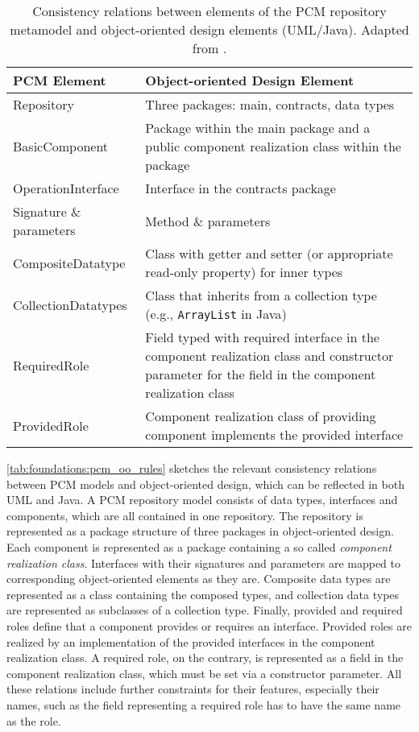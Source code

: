 \begin{table}
	\centering 
    \small
    \renewcommand{\arraystretch}{1.4}
	\begin{tabular}{p{3.2cm} p{6.6cm}}
		\toprule
        \textbf{\gls{PCM} Element}  & \textbf{Object-oriented Design Element} \\
        \midrule
		Repository              & Three packages: main, contracts, data types\\
		BasicComponent 		    & Package within the main package and a public component realization class within the package \\
		OperationInterface		& Interface in the contracts package \\
		Signature \& parameters & Method \& parameters \\
		CompositeDatatype       & Class with getter and setter (or appropriate read-only property) for inner types\\
		CollectionDatatypes     & Class that inherits from a collection type (e.g., \texttt{ArrayList} in Java) \\
		RequiredRole		    & Field typed with required interface in the component realization class and constructor parameter for the field in the component realization class\\
		ProvidedRole		    & Component realization class of providing component implements the provided interface\\
		\bottomrule
	\end{tabular}
	\caption[Consistency relations between PCM and UML/Java]{Consistency relations between elements of the \gls{PCM} repository metamodel and object-oriented design elements (\gls{UML}/Java). Adapted from \cite[Table 4.1]{langhammer2017a}.}
	\label{tab:foundations:pcm_oo_rules}
\end{table}

\autoref{tab:foundations:pcm_oo_rules} sketches the relevant consistency relations between \gls{PCM} models and object-oriented design, which can be reflected in both \gls{UML} and Java.
A \gls{PCM} repository model consists of data types, interfaces and components, which are all contained in one repository.
The repository is represented as a package structure of three packages in object-oriented design.
Each component is represented as a package containing a so called \emph{component realization class}.
Interfaces with their signatures and parameters are mapped to corresponding object-oriented elements as they are.
Composite data types are represented as a class containing the composed types, and collection data types are represented as subclasses of a collection type.
Finally, provided and required roles define that a component provides or requires an interface.
Provided roles are realized by an implementation of the provided interfaces in the component realization class.
A required role, on the contrary, is represented as a field in the component realization class, which must be set via a constructor parameter.
All these relations include further constraints for their features, especially their names, such as the field representing a required role has to have the same name as the role.

